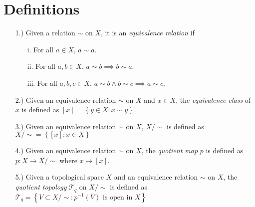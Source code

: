 \documentclass[12pt]{article}
\newcommand{\bracks}[1]{\left[#1\right]}             %
\newcommand{\braces}[1]{\left\{#1\right\}}           %
\begin{document}
\pagestyle{fancy}
\fancyhead{}

\normalsize

\section*{Definitions}
\begin{itemize}
    \item [1.)] Given a relation $\sim$ on $X$, it is an \textit{equivalence relation} if
    \begin{itemize}
        \item [i.] For all $a\in X$, $a\sim a$.

        \item [ii.] For all $a,b\in X$, $a\sim b\implies b\sim a$.

        \item [iii.] For all $a,b,c\in X$, $a\sim b\land b\sim c\implies a\sim c$.
    \end{itemize}

    \item [2.)] Given an equivalence relation $\sim$ on $X$ and $x\in X$, the \textit{equivalence class} of $x$ is defined as $\bracks{x}=\braces{y\in X:x\sim y}$.

    \item [3.)] Given an equivalence relation $\sim$ on $X$, $X/{\sim}$ is defined as $X/{\sim}=\braces{[x]:x\in X}$

    \item [4.)] Given an equivalence relation $\sim$ on $X$, the \textit{quotient map} $p$ is defined as $p:X\to X/{\sim}$ where $x\mapsto\bracks{x}$.

    \item [5.)] Given a topological space $X$ and an equivalence relation $\sim$ on $X$, the \textit{quotient topology} $\mathcal{T}_q$ on $X/{\sim}$ is defined as $\mathcal{T}_q=\braces{V\subset X/{\sim}:p^{-1}(V)\text{ is open in }X}$
\end{itemize}
\end{document}
